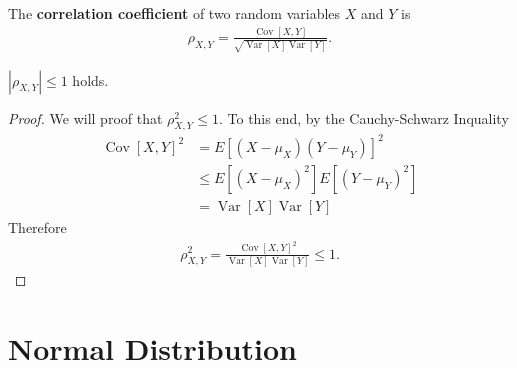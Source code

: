 \documentclass{memoir}
\newcommand{\Cov}{\operatorname{Cov}}
\newcommand{\Var}{\operatorname{Var}}
\begin{document}
\begin{definition}
    The \textbf{correlation coefficient} of two random variables $X$ and $Y$ is
    \begin{align*}
        \rho_{X,Y} = \frac{\Cov[X,Y]}{\sqrt{\Var[X]\Var[Y]}}.
    \end{align*}
\end{definition}

\begin{theorem}
    $|\rho_{X,Y}|\le1$ holds.
\end{theorem}
\begin{proof}
    We will proof that $\rho_{X,Y}^2 \le 1$. To this end, by the Cauchy-Schwarz Inquality
    \begin{align*}
        \Cov[X,Y]^2 &= E[(X- \mu_X)(Y- \mu_Y)]^2 \\
        &\le E[(X-\mu_X)^2] E[(Y- \mu_Y)^2] \\
        &= \Var[X] \Var[Y]
    \end{align*}
    Therefore
    \begin{align*}
        \rho_{X,Y}^2 = \frac{\Cov[X,Y]^2}{\Var[X]\Var[Y]} \le 1.
    \end{align*}
\end{proof}

\section{Normal Distribution}
\end{document}
